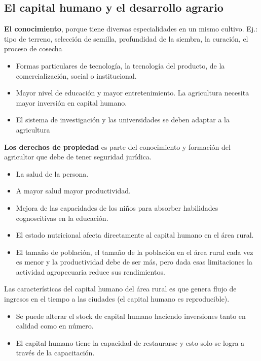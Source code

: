 \documentclass[
  a4paper,
]{article}
\begin{document}
\hypertarget{el-capital-humano-y-el-desarrollo-agrario}{%
\subsection{El capital humano y el desarrollo
agrario}\label{el-capital-humano-y-el-desarrollo-agrario}}

\textbf{El conocimiento}, porque tiene diversas especialidades en un
mismo cultivo. Ej.: tipo de terreno, selección de semilla, profundidad
de la siembra, la curación, el proceso de cosecha

\begin{itemize}
\item
  Formas particulares de tecnología, la tecnología del producto, de la
  comercialización, social o institucional.
\item
  Mayor nivel de educación y mayor entretenimiento. La agricultura
  necesita mayor inversión en capital humano.
\item
  El sistema de investigación y las universidades se deben adaptar a la
  agricultura
\end{itemize}

\textbf{Los derechos de propiedad} es parte del conocimiento y formación
del agricultor que debe de tener seguridad jurídica.

\begin{itemize}
\item
  La salud de la persona.
\item
  A mayor salud mayor productividad.
\item
  Mejora de las capacidades de los niños para absorber habilidades
  cognoscitivas en la educación.
\item
  El estado nutricional afecta directamente al capital humano en el área
  rural.
\item
  El tamaño de población, el tamaño de la población en el área rural
  cada vez es menor y la productividad debe de ser más, pero dada esas
  limitaciones la actividad agropecuaria reduce sus rendimientos.
\end{itemize}

Las características del capital humano del área rural es que genera
flujo de ingresos en el tiempo a las ciudades (el capital humano es
reproducible).

\begin{itemize}
\item
  Se puede alterar el stock de capital humano haciendo inversiones tanto
  en calidad como en número.
\item
  El capital humano tiene la capacidad de restaurarse y esto solo se
  logra a través de la capacitación.
\end{itemize}
\end{document}
